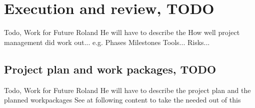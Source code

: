 \section{Execution and review, TODO}


Todo,
Work for Future Roland
He will have to describe the How well project management did work out...
e.g. Phases
Milestones
Tools...
Risks...

\subsection*{Project plan and work packages, TODO}
Todo,
Work for Future Roland
He will have to describe the project plan and the planned workpackages
See at following content to take the needed out of this


